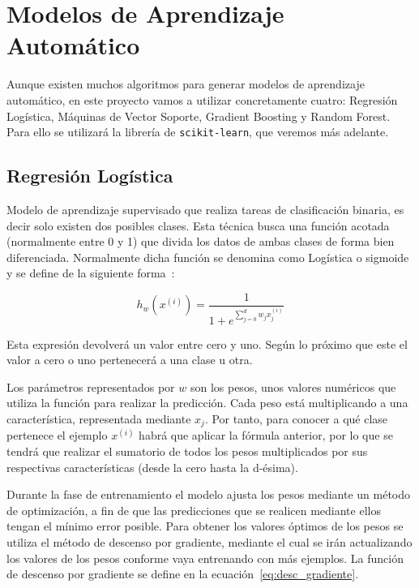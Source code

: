 \documentclass[a4paper, 12pt]{book}
\begin{document}
\section{Modelos de Aprendizaje Automático}
\label{sec:modelos_aautomatico}

Aunque existen muchos algoritmos para generar modelos de aprendizaje automático, en este proyecto vamos a utilizar concretamente cuatro: Regresión Logística, Máquinas de Vector Soporte, Gradient Boosting y Random Forest. Para ello se utilizará la librería de \texttt{scikit-learn}, que veremos más adelante.

\subsection{Regresión Logística}
\label{subsec:regresion_logistica}

Modelo de aprendizaje supervisado que realiza tareas de clasificación binaria, es decir solo existen dos posibles clases. Esta técnica busca una función acotada (normalmente entre 0 y 1) que divida los datos de ambas clases de forma bien diferenciada. Normalmente dicha función se denomina como Logística o sigmoide y se define de la siguiente forma~\cite{Watt2020}:

\begin{equation}
    h_w(x^{(i)}) = \frac{1}{1 + e^{\sum_{j=0}^{d} w_j x_j^{(i)} }}
\end{equation}

Esta expresión devolverá un valor entre cero y uno. Según lo próximo que este el valor a cero o uno pertenecerá a una clase u otra. 

Los parámetros representados por $w$ son los pesos, unos valores numéricos que utiliza la función para realizar la predicción. Cada peso está multiplicando a una característica, representada mediante $x_j$. Por tanto, para conocer a qué clase pertenece el ejemplo $x^{(i)}$ habrá que aplicar la fórmula anterior, por lo que se tendrá que realizar el sumatorio de todos los pesos multiplicados por sus respectivas características (desde la cero hasta la d-ésima). 

Durante la fase de entrenamiento el modelo ajusta los pesos mediante un método de optimización, a fin de que las predicciones que se realicen mediante ellos tengan el mínimo error posible. Para obtener los valores óptimos de los pesos se utiliza el método de descenso por gradiente, mediante el cual se irán actualizando los valores de los pesos conforme vaya entrenando con más ejemplos. La función de descenso por gradiente se define en la ecuación~\ref{eq:desc_gradiente}.
\end{document}
